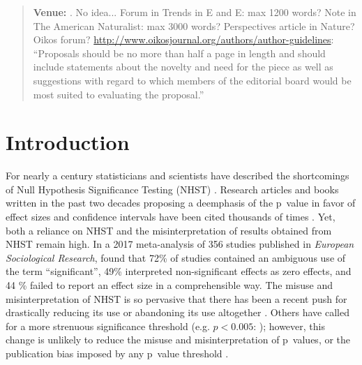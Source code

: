\begin{abstract}
\textbf{Venue:} . No idea... Forum in Trends in E and E: max 1200 words?
Note in The American Naturalist: max 3000 words? Perspectives article in Nature?
Oikos forum? \url{http://www.oikosjournal.org/authors/author-guidelines}: ``Proposals should be no more than half a page in length and should include statements about the novelty and need for the piece as well as suggestions with regard to which members of the editorial board would be most suited to evaluating the proposal.''

\end{abstract}

\flushbottom
\maketitle
\newpage
\thispagestyle{empty}

\section*{Introduction}

For nearly a century statisticians and scientists have described the shortcomings of Null Hypothesis Significance Testing
(NHST) \citep[see][]{Cohen1994}. Research articles and books written in the past two decades proposing a deemphasis of the 
p~value in favor of effect sizes and confidence intervals have been cited thousands of times \citep{Cohen1994, Goodman1999, 
Wilkinson1999, ZiliakandMcCloskey2008, WassersteinandLazar2016}. Yet, both a reliance on NHST and the misinterpretation of 
results obtained from NHST remain high. In a 2017 meta-analysis of 356 studies published in \emph{European Sociological 
Research}, \citet{Bernardietal.2017} found that 72\% of studies contained an ambiguous use of the term ``significant'', 
49\% interpreted non-significant effects as zero effects, and 44 \% failed to report an effect size in a comprehensible 
way. The misuse and misinterpretation of NHST is so pervasive that there has been a recent push for drastically reducing its 
use \citep{SzucsandIoannidis2017} or abandoning its use altogether \citep{McShaneetal.2017}. Others have called for a more
strenuous significance threshold (e.g. $p < 0.005$: \citealt{Benjaminetal.2018}); however, this change is unlikely to reduce
the misuse and misinterpretation of p~values, or the publication bias imposed by any p~value threshold \citep{Ridleyetal.2007}.

